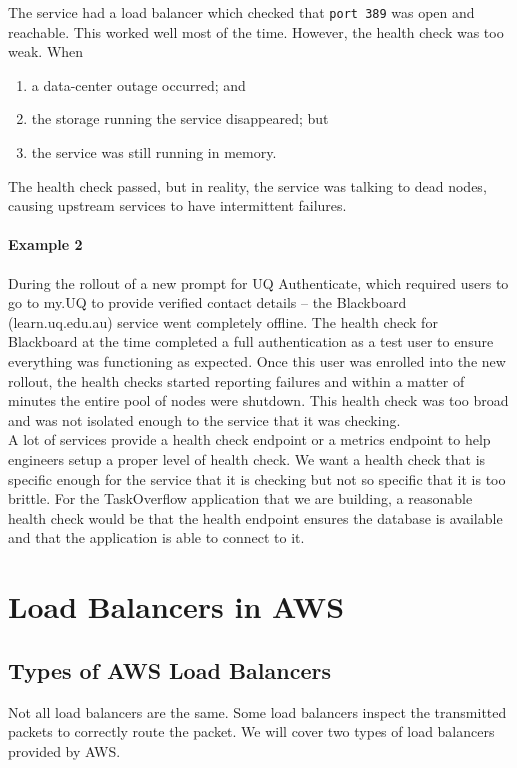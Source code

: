 \documentclass{csse4400}
\begin{document}
The service had a load balancer which checked that \texttt{port 389} was open and reachable. 
This worked well most of the time.
However, the health check was too weak. When
\begin{enumerate} 
    \item a data-center outage occurred; and
    \item the storage running the service disappeared; but 
    \item the service was still running in memory.
\end{enumerate}

\noindent
The health check passed, but in reality, the service was talking to dead nodes, causing upstream services to have intermittent failures. 

\paragraph{Example 2} During the rollout of a new prompt for UQ Authenticate, which required users to go to my.UQ to provide verified contact details -- the Blackboard (learn.uq.edu.au) service went completely offline.
The health check for Blackboard at the time completed a full authentication as a test user to ensure everything was functioning as expected.
Once this user was enrolled into the new rollout,
the health checks started reporting failures and within a matter of minutes the entire pool of nodes were shutdown.
This health check was too broad and was not isolated enough to the service that it was checking.\\

\noindent
A lot of services provide a health check endpoint or a metrics endpoint to help engineers setup a proper level of health check.
We want a health check that is specific enough for the service that it is checking but not so specific that it is too brittle.
For the TaskOverflow application that we are building,
a reasonable health check would be that the health endpoint ensures the database is available
and that the application is able to connect to it.


\section{Load Balancers in AWS}

\subsection{Types of AWS Load Balancers}
Not all load balancers are the same.
Some load balancers inspect the transmitted packets to correctly route the packet.
We will cover two types of load balancers provided by AWS.
\end{document}
